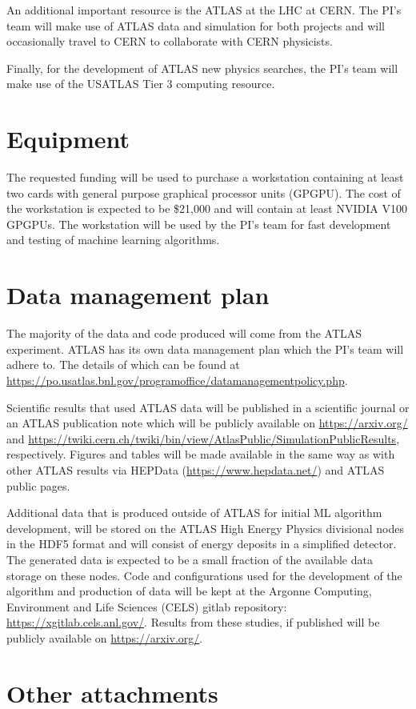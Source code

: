 \documentclass[letter, USenglish, 11pt, subfigure]{article}
\begin{document}
An additional important resource is the ATLAS at the LHC at CERN. The PI's team will make use of ATLAS data and simulation for both projects and will occasionally travel to CERN to collaborate with CERN physicists.

Finally, for the development of ATLAS new physics searches, the PI's team will make use of the USATLAS Tier 3 computing resource.

\clearpage

\section{Equipment}
The requested funding will be used to purchase a workstation containing at least two cards with general purpose graphical processor units (GPGPU). The cost of the workstation is expected to be  \$21,000 and will contain at least NVIDIA V100 GPGPUs. The workstation will be used by the PI's team for fast development and testing of machine learning algorithms. 
\clearpage

\section{Data management plan}
The majority of the data and code produced will come from the ATLAS experiment. ATLAS has its own data management plan which the PI's team will adhere to. The details of which can be found at \url{https://po.usatlas.bnl.gov/programoffice/datamanagementpolicy.php}.

Scientific results that used ATLAS data will be published in a scientific journal or an ATLAS publication note which will be publicly available on \url{https://arxiv.org/} and \url{https://twiki.cern.ch/twiki/bin/view/AtlasPublic/SimulationPublicResults}, respectively. Figures and tables will be made available in the same way as with other ATLAS results via HEPData (\url{https://www.hepdata.net/}) and ATLAS public pages. 

Additional data that is produced outside of ATLAS for initial ML algorithm development, will be stored on the ATLAS High Energy Physics divisional nodes in the HDF5 format and will consist of energy deposits in a simplified detector. The generated data is expected to be a small fraction of the available data storage on these nodes. Code and configurations used for the development of the algorithm and production of data will be kept at the Argonne Computing, Environment and Life Sciences (CELS) gitlab repository: \url{https://xgitlab.cels.anl.gov/}. Results from these studies, if published will be publicly available on \url{https://arxiv.org/}. 

\clearpage

\section{Other attachments}
\end{document}

